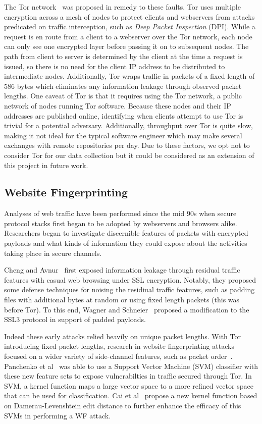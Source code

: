 \documentclass[sigconf,authorversion,nonacm]{acmart}
\begin{document}
The Tor network~\citep{dingledine2004tor} was proposed in remedy to these faults. Tor uses multiple encryption across a mesh of nodes to protect clients and webservers from attacks predicated on traffic interception, such as \textit{Deep Packet Inspection} (DPI). While a request is en route from a client to a webserver over the Tor network, each node can only see one encrypted layer before passing it on to subsequent nodes. The path from client to server is determined by the client at the time a request is issued, so there is no need for the client IP address to be distributed to intermediate nodes. Additionally, Tor wraps traffic in packets of a fixed length of 586 bytes which eliminates any information leakage through observed packet lengths. One caveat of Tor is that it requires using the Tor network, a public network of nodes running Tor software. Because these nodes and their IP addresses are published online, identifying when clients attempt to use Tor is trivial for a potential adversary. Additionally, throughput over Tor is quite slow, making it not ideal for the typical software engineer which may make several exchanges with remote repositories per day. Due to these factors, we opt not to consider Tor for our data collection but it could be considered as an extension of this project in future work.

\subsection{Website Fingerprinting}
Analyses of web traffic have been performed since the mid 90s when secure protocol stacks first began to be adopted by webservers and browsers alike. Researchers began to investigate discernible features of packets with encrypted payloads and what kinds of information they could expose about the activities taking place in secure channels.

Cheng and Avnur~\citep{cheng1998traffic} first exposed information leakage through residual traffic features with casual web browsing under SSL encryption. Notably, they proposed some defense techniques for noising the residiual traffic features, such as padding files with additional bytes at random or using fixed length packets (this was before Tor). To this end, Wagner and Schneier~\citep{wagner1996analysis} proposed a modification to the SSL3 protocol in support of padded payloads.

Indeed these early attacks relied heavily on unique packet lengths. With Tor~\citep{dingledine2004tor} introducing fixed packet lengths, research in website fingerprinting attacks focused on a wider variety of side-channel features, such as packet order~\citep{panchenko2011website}. Panchenko et al~\citep{panchenko2011website} was able to use a Support Vector Machine (SVM) classifier with these new feature sets to expose vulnerabilties in traffic secured through Tor. In SVM, a kernel function maps a large vector space to a more refined vector space that can be used for classification. Cai et al~\citep{cai2012touching} propose a new kernel function based on Damerau-Levenshtein edit distance to further enhance the efficacy of this SVMs in performing a WF attack.
\end{document}
